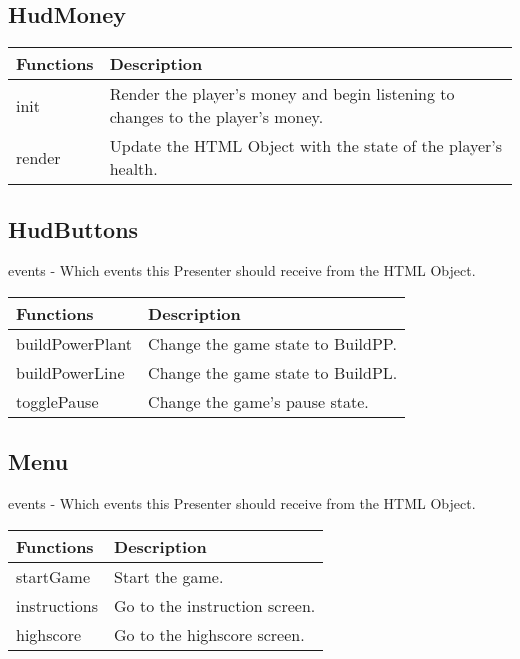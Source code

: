 \subsection*{HudMoney}
	\begin{table}[H]
	\begin{tabular}{p{4cm} | p{8cm} }
	\hline
	\rowcolor{gray}
	Functions & Description \\ \hline
	init & Render the player's money and begin listening to changes to the player's money. \\ \hline
	render & Update the HTML Object with the state of the player's health. \\ \hline
	\end{tabular}
	\end{table}


\subsection*{HudButtons}

	events - Which events this Presenter should receive from the HTML Object.

	\begin{table}[H]
	\begin{tabular}{p{4cm} | p{8cm} }
	\hline
	\rowcolor{gray}
	Functions & Description \\ \hline
	buildPowerPlant & Change the game state to BuildPP. \\ \hline
	buildPowerLine & Change the game state to BuildPL. \\ \hline
	togglePause & Change the game's pause state. \\ \hline
	\end{tabular}
	\end{table}

\subsection*{Menu}

	events - Which events this Presenter should receive from the HTML Object.

	\begin{table}[H]
	\begin{tabular}{p{4cm} | p{8cm} }
	\hline
	\rowcolor{gray}
	Functions & Description \\ \hline
	startGame & Start the game. \\ \hline
	instructions & Go to the instruction screen. \\ \hline
	highscore & Go to the highscore screen. \\ \hline
	\end{tabular}
	\end{table}

